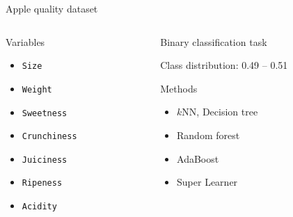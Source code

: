 


\begin{frame}{Apple quality dataset}

\vspace*{-2.5em}\begin{columns}[T]
\begin{column}{0.5\textwidth}
Variables


\begin{itemize}
	\item \texttt{Size}
	\item \texttt{Weight}
	\item \texttt{Sweetness}
	\item \texttt{Crunchiness}
	\item \texttt{Juiciness}
	\item \texttt{Ripeness}
	\item \texttt{Acidity}
\end{itemize}

\end{column}
\hspace*{-2em}%
\begin{column}{0.5\textwidth}
\alert{Binary classification} task%

Class distribution: 0.49 -- 0.51

\vspace{1em}Methods
\begin{itemize}
	\item $k\text{NN}$, Decision tree%
	\item Random forest
	\item AdaBoost
	\item \alert{Super Learner}
\end{itemize}
\end{column}
\end{columns}

\end{frame}

